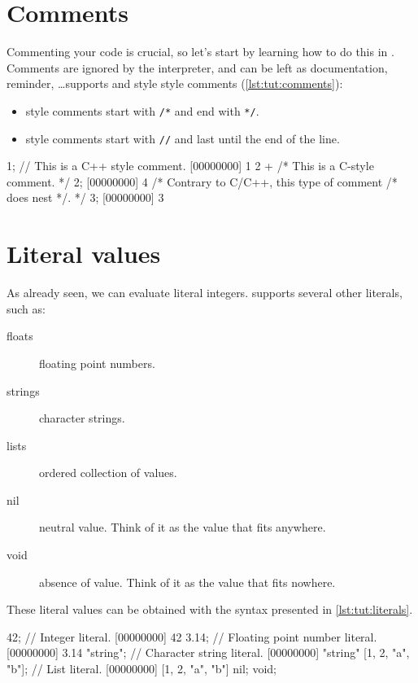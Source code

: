 \section{Comments}

Commenting your code is crucial, so let's start by learning how to do
this in \us. Comments are ignored by the interpreter, and
can be left as documentation, reminder, \ldots \us supports \C and
\Cxx style style comments (\autoref{lst:tut:comments}):

\begin{itemize}
\item \C style comments start with \texttt{/*} and end with \texttt{*/}.
\item \Cxx style comments start with \texttt{//} and last until the
  end of the line.
\end{itemize}


\begin{urbiscript}[caption=Comments in \us, label=lst:tut:comments]
1; // This is a C++ style comment.
[00000000] 1
2 + /* This is a C-style comment. */ 2;
[00000000] 4
/* Contrary to C/C++, this type of comment /* does nest */. */
3;
[00000000] 3
\end{urbiscript}


\section{Literal values}

As already seen, we can evaluate literal integers. \us supports
several other literals, such as:

\begin{description}
\item[floats] floating point numbers.
\item[strings] character strings.
\item[lists] ordered collection of values.
\item[nil] neutral value. Think of it as the value that fits anywhere.
\item[void] absence of value. Think of it as the value that fits nowhere.
\end{description}

These literal values can be obtained with the syntax presented in
\autoref{lst:tut:literals}.

\begin{urbiscript}[caption=Literals,label=lst:tut:literals]
42; // Integer literal.
[00000000] 42
3.14; // Floating point number literal.
[00000000] 3.14
"string"; // Character string literal.
[00000000] "string"
[1, 2, "a", "b"]; // List literal.
[00000000] [1, 2, "a", "b"]
nil;
void;
\end{urbiscript}

